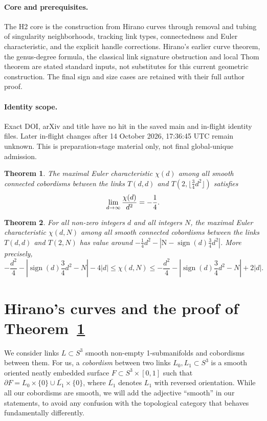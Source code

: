 \documentclass[10pt,a4paper]{article}
\newtheorem{theo}{Theorem}[section]
\theoremstyle{definition}
\numberwithin{equation}{section}
\DeclareMathOperator{\signn}{sign}
\newcommand{\rmN}{\mathrm{N}}
\renewcommand*{\to}{\mathchoice{\longrightarrow}{\rightarrow}{\rightarrow}{\rightarrow}}
\begin{document}
\paragraph{Core and prerequisites.} The H2 core is the construction from Hirano curves through removal and tubing of singularity neighborhoods, tracking link types, connectedness and Euler characteristic, and the explicit handle corrections. Hirano's earlier curve theorem, the genus-degree formula, the classical link signature obstruction and local Thom theorem are stated standard inputs, not substitutes for this current geometric construction. The final sign and size cases are retained with their full author proof.

\paragraph{Identity scope.} Exact DOI, arXiv and title have no hit in the saved main and in-flight identity files. Later in-flight changes after 14 October 2026, 17:36:45 UTC remain unknown. This is preparation-stage material only, not final global-unique admission.

\setcounter{section}{1}\setcounter{theo}{0}

\begin{theo}\label{threequarters}
The maximal Euler characteristic $\chi(d)$ among all smooth connected cobordisms between the links $T(d,d)$ and $T(2,\lfloor\frac{3}{4}d^2\rfloor)$ satisfies
\[
\lim_{d \to \infty} \frac{\chi(d)}{d^2}=-\frac{1}{4}.
\]
\end{theo}


\begin{theo}\label{prop:cobdist}
For all non-zero integers $d$ and all integers $N$, the maximal Euler characteristic $\chi(d,N)$ among all smooth connected cobordisms between the links $T(d,d)$ and $T(2,N)$ has value around $-\frac{1}{4}d^2-|\rmN-\signn(d)\frac{3}{4}d^2|$. More precisely,
\[
-\frac{d^2}{4}-\left|\signn(d)\frac{3}{4}d^2-N\right|-4|d|
\leq\chi(d,N)\leq -\frac{d^2}{4}-\left|\signn(d)\frac{3}{4}d^2-N\right|+2|d|.
\]
\end{theo}


\section{Hirano's curves and the proof of Theorem~\ref{threequarters} }\label{sec:main}

We consider links $L\subset S^3$ smooth non-empty 1-submanifolds and cobordisms between them. For us, a \emph{cobordism} between two links $L_0,L_1\subset S^3$ is a smooth oriented neatly embedded surface $F\subset S^3\times[0,1]$ such that $\partial F=L_0\times\{0\}\cup \bar{L_1}\times\{0\}$, where $\bar{L_1}$ denotes $L_1$ with reversed orientation. While all our cobordisms are smooth, we will add the adjective ``smooth'' in our statements, to avoid any confusion with the topological category that behaves fundamentally differently.
\end{document}
